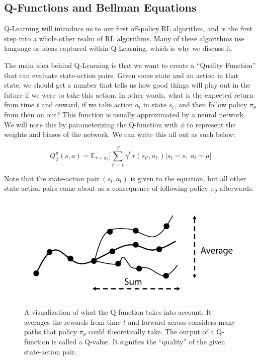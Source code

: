 \subsection{Q-Functions and Bellman Equations}
\begin{flushleft}
    \large Q-Learning will introduce us to our first off-policy RL algorithm, and is the first step into a whole other realm of RL algorithms. Many of these algorithms use language or ideas captured within Q-Learning, which is why we discuss it. \break

    The main idea behind Q-Learning is that we want to create a ``Quality Function'' that can evaluate state-action pairs. Given some state and an action in that state, we should get a number that tells us how good things will play out in the future if we were to take this action. In other words, what is the expected return from time $t$ and onward, if we take action $a_t$ in state $s_t$, and then follow policy $\pi_\theta$ from then on out? This function is usually approximated by a neural network. We will note this by parameterizing the Q-function with $\phi$ to represent the weights and biases of the network. We can write this all out as such below:

    $$Q_\phi^\pi(s, a) = \mathbb{E}_{\tau \sim \pi_\theta} \biggl[\sum_{t' = t}^T \gamma^{t'}r(s_{t'}, a_{t'}) | s_t = s,\;a_t = a\biggr]$$
    
    Note that the state-action pair $(s_t, a_t)$ is given to the equation, but all other state-action pairs come about as a consequence of following policy $\pi_\theta$ afterwards. \break

    \begin{figure}[H]
        \centering
        \includegraphics[width=0.7\linewidth]{rl/qlearning.png}
        \caption{A visualization of what the Q-function takes into account. It averages the rewards from time $t$ and forward across considers many paths that policy $\pi_\theta$ could theoretically take. The output of a Q-function is called a Q-value. It signifies the ``quality'' of the given state-action pair.}
        \label{fig:qlearning}
    \end{figure}


\end{flushleft}
